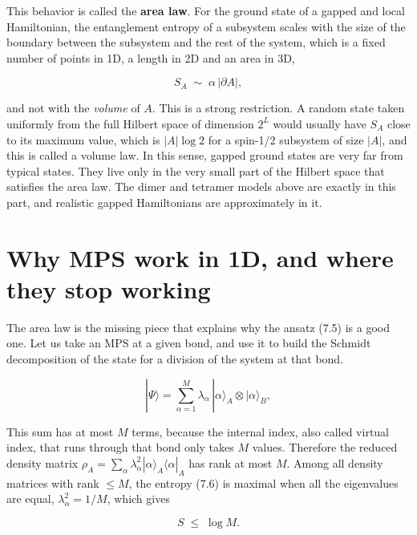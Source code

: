 This behavior is called the \textbf{area law}. For the ground state of a gapped and local Hamiltonian,
the entanglement entropy of a subsystem scales with the size of the boundary between the subsystem
and the rest of the system, which is a fixed number of points in 1D, a length in 2D and an area in 3D,

\begin{equation}
S_A \;\sim\; \alpha\, |\partial A|,
\end{equation}

and not with the \emph{volume} of $A$. This is a strong restriction. A random state taken uniformly
from the full Hilbert space of dimension $2^L$ would usually have $S_A$ close to its maximum value,
which is $|A|\log 2$ for a spin-1/2 subsystem of size $|A|$, and this is called a volume law. In this
sense, gapped ground states are very far from typical states. They live only in the very small part
of the Hilbert space that satisfies the area law. The dimer and tetramer models above are exactly in
this part, and realistic gapped Hamiltonians are approximately in it.

\section{Why MPS work in 1D, and where they stop working}

The area law is the missing piece that explains why the ansatz (7.5) is a good one. Let us take an
MPS at a given bond, and use it to build the Schmidt decomposition of the state for a division of the
system at that bond.

\begin{equation*}
|\Psi\rangle = \sum_{\alpha=1}^{M} \lambda_\alpha\, |\alpha\rangle_A \otimes |\alpha\rangle_B,
\end{equation*}

This sum has at most $M$ terms, because the internal index, also called virtual index, that runs
through that bond only takes $M$ values. Therefore the reduced density matrix $\rho_A = \sum_\alpha
\lambda_\alpha^2 |\alpha\rangle_A
\langle\alpha|_A$ has rank at most $M$. Among all density matrices with rank $\le M$, the
entropy (7.6) is maximal when all the eigenvalues are equal, $\lambda_\alpha^2 = 1/M$, which gives

\begin{equation}
S \;\le\; \log M.
\end{equation}

